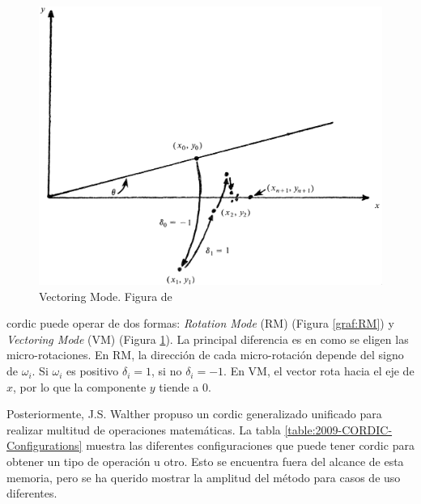 \begin{figure}[ht]
	\centering
	\includegraphics[width=\textwidth]{archivos/CORDIC/VectoringMode.png}
	\caption{Vectoring Mode. Figura de \cite{schelin_calculator_1983}}
	\label{graf:VM}
\end{figure}

\gls{cordic} puede operar de dos formas: \textit{Rotation Mode} (RM) (Figura \ref{graf:RM}) y \textit{Vectoring Mode} (VM) (Figura \ref{graf:VM}). La principal diferencia es en como se eligen las micro-rotaciones. En RM, la dirección de cada micro-rotación depende del signo de $\omega_{i}$. Si $\omega_{i}$ es positivo $\delta_{i} = 1$, si no $\delta_{i} = -1$. En VM, el vector rota hacia el eje de $x$, por lo que la componente $y$ tiende a 0.

Posteriormente, J.S. Walther propuso un \gls{cordic} generalizado unificado para realizar multitud de operaciones matemáticas. La tabla \ref{table:2009-CORDIC-Configurations} muestra las diferentes configuraciones que puede tener \gls{cordic} para obtener un tipo de operación u otro. Esto se encuentra fuera del alcance de esta memoria, pero se ha querido mostrar la amplitud del método para casos de uso diferentes.


